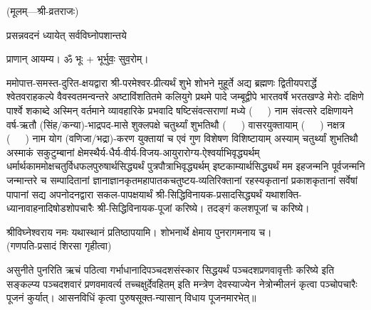 
\setlength{\parindent}{0pt}
\centerline{\small{(मूलम्—श्री-व्रतराजः)}}




{प्रसन्नवदनं ध्यायेत् सर्वविघ्नोपशान्तये}

प्राणान् आयम्य। ॐ भूः + भूर्भुवः॒ सुव॒रोम्।


ममोपात्त-समस्त-दुरित-क्षयद्वारा श्री-परमेश्वर-प्रीत्यर्थं शुभे शोभने मुहूर्ते अद्य ब्रह्मणः
द्वितीयपरार्द्धे श्वेतवराहकल्पे वैवस्वतमन्वन्तरे अष्टाविंशतितमे कलियुगे प्रथमे पादे
जम्बूद्वीपे भारतवर्षे भरतखण्डे मेरोः दक्षिणे पार्श्वे शकाब्दे अस्मिन् वर्तमाने व्यावहारिके
प्रभवादि षष्टिसंवत्सराणां मध्ये \mbox{(~~~)} नाम संवत्सरे दक्षिणायने 
वर्ष-ऋतौ (सिंह/कन्या)-भाद्रपद-मासे शुक्लपक्षे चतुर्थ्यां शुभतिथौ \mbox{(~~~)} वासरयुक्तायाम्
\mbox{(~~~)} नक्षत्र \mbox{(~~~)} नाम योग 
(वणिजा/भद्रा)-करण युक्तायां च एवं गुण विशेषण विशिष्टायाम्
अस्याम् चतुर्थ्यां शुभतिथौ 
अस्माकं सकुटुम्बानां क्षेमस्थैर्य-धैर्य-वीर्य-विजय-आयुरारोग्य-ऐश्वर्याभिवृद्ध्यर्थम्
धर्मार्थकाममोक्ष\-चतुर्विधफलपुरुषार्थसिद्ध्यर्थं पुत्रपौत्राभि\-वृद्ध्यर्थम् इष्टकाम्यार्थसिद्ध्यर्थं
मम इहजन्मनि पूर्वजन्मनि जन्मान्तरे च सम्पादितानां ज्ञानाज्ञानकृतमहा\-पातकचतुष्टय-व्यतिरिक्तानां 
रहस्यकृतानां प्रकाशकृतानां सर्वेषां पापानां सद्य अपनोदनद्वारा 
सकल-पापक्षयार्थं श्री-सिद्धिविनायक-प्रसादसिद्ध्यर्थं 
यथाशक्ति-ध्यानावाहनादिषोडशोपचारैः श्री-सिद्धिविनायक-पूजां करिष्ये। तदङ्गं कलशपूजां च करिष्ये। 

श्रीविघ्नेश्वराय नमः यथास्थानं प्रतिष्ठापयामि। शोभनार्थे क्षेमाय पुनरागमनाय च।\\
(गणपति-प्रसादं शिरसा गृहीत्वा)














असुनीते पुनरिति ऋचं पठित्वा गर्भाधानादिपञ्चदशसंस्कार सिद्धयर्थं पञ्चदशप्रणवावृत्तीः करिष्ये इति सङ्कल्प्य पञ्चदशवारं प्रणवमावर्त्य तच्चक्षुर्देवहितम् इति मन्त्रेण देवस्याज्येन नेत्रोन्मीलनं कृत्वा पञ्चोपचारैः पूजनं कुर्यात्। 
आसनविधिं कृत्वा पुरुषसूक्त-न्यासान् विधाय पूजनमारभेत्॥ 


